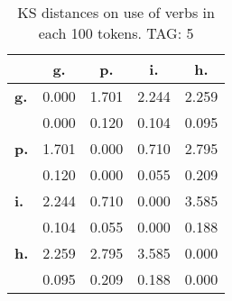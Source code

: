 \begin{table}[h!]
\begin{center}
\begin{tabular}{| l || c | c | c | c |}\hline
 & {\bf g.} & {\bf p.} & {\bf i.} & {\bf h.} \\\hline\hline
{\bf g.} & 0.000 & 1.701 & 2.244 & 2.259 \\
{\bf } & 0.000 & 0.120 & 0.104 & 0.095 \\\hline
{\bf p.} & 1.701 & 0.000 & 0.710 & 2.795 \\
{\bf } & 0.120 & 0.000 & 0.055 & 0.209 \\\hline
{\bf i.} & 2.244 & 0.710 & 0.000 & 3.585 \\
{\bf } & 0.104 & 0.055 & 0.000 & 0.188 \\\hline
{\bf h.} & 2.259 & 2.795 & 3.585 & 0.000 \\
{\bf } & 0.095 & 0.209 & 0.188 & 0.000 \\\hline
\end{tabular}
\caption{KS distances on use of verbs in each 100 tokens. TAG: 5}
\end{center}
\end{table}